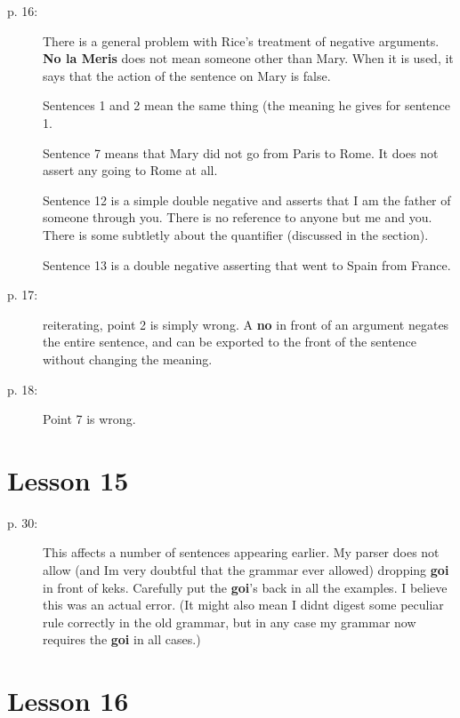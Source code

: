 \documentclass[12pt]{article}
\begin{document}
\begin{description}

\item[p. 16:]  There is a general problem with Rice's treatment of negative arguments.  {\bf No la Meris} does not mean someone other than Mary.  When it is used, it says that the action of the sentence on Mary is false.

Sentences 1 and 2 mean the same thing (the meaning he gives for sentence 1.

Sentence 7 means that Mary did not go from Paris to Rome.  It does not assert any going to Rome at all.

Sentence 12 is a simple double negative and asserts that I am the father of someone through you.  There is no reference to anyone but me and you.  There is some subtletly about the quantifier (discussed in the section).

Sentence 13 is a double negative asserting that went to Spain from France.

\item[p. 17:]  reiterating, point 2 is simply wrong.  A {\bf no} in front of an argument negates the entire sentence, and can be exported to the front of the sentence without changing the meaning.

\item[p. 18:]  Point 7 is wrong.



\end{description}

\section{Lesson 15}

\begin{description}

\item[p. 30:]  This affects a number of sentences appearing earlier.  My parser does not allow (and Im very doubtful that the grammar ever allowed) dropping {\bf goi} in front of keks.  Carefully put the {\bf goi}'s back in all the examples.  I believe this was an actual error.  (It might also mean I didnt digest some peculiar rule correctly in the old grammar, but in any case my grammar now requires the {\bf goi} in all cases.)

\end{description}

\section{Lesson 16}
\end{document}

